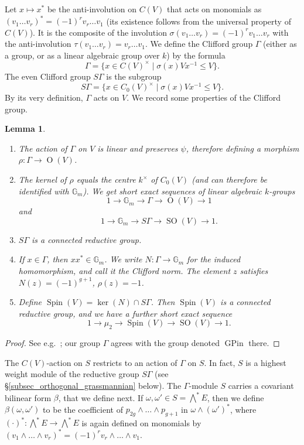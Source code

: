 \documentclass{article} %
\newtheorem{lemma}[proposition]{Lemma}
\numberwithin{equation}{section}
\newcommand{\G}{\mathbb{G}}
\DeclareMathOperator{\SO}{SO}
\DeclareMathOperator{\OO}{O}
\DeclareMathOperator{\Spin}{Spin}
\begin{document}
Let $x \mapsto x^\ast$ be the anti-involution on $C(V)$ that acts on monomials  as $(v_1 \dots v_r)^\ast = (-1)^r v_r \dots v_1$ (its existence follows from the universal property of $C(V)$). It is the composite of the involution $\sigma(v_1 \dots v_r) = (-1)^r v_1 \dots v_r$ with the anti-involution $\tau(v_1 \dots v_r) = v_r \dots v_1$. We define the Clifford group $\Gamma$ (either as a group, or as a linear algebraic group over $k$) by the formula
\[ \Gamma = \{ x \in C(V)^\times \mid \sigma(x) V x^{-1}\leq V \}. \]
The even Clifford group $S \Gamma$ is the subgroup
\[ S \Gamma = \{ x \in C_0(V)^\times \mid \sigma(x) V x^{-1} \leq V \}.\]
By its very definition, $\Gamma$ acts on $V$. We record some properties of the Clifford group.
\begin{lemma}
    \begin{enumerate}
        \item The action of $\Gamma$ on $V$ is linear and preserves $\psi$, therefore defining a morphism $\rho : \Gamma \to \OO(V)$.
        \item The kernel of $\rho$ equals the centre $k^\times$ of $C_0(V)$ (and can therefore be identified with $\G_m$). We get short exact sequences of linear algebraic $k$-groups
        \[ 1 \to \G_m \to \Gamma \to \OO(V) \to 1 \]
        and
        \[ 1 \to \G_m \to S \Gamma \to \SO(V) \to 1. \]
        \item $S \Gamma$ is a connected reductive group.
        \item If $x \in \Gamma$, then $x x^\ast \in \G_m$. We write $N : \Gamma \to \G_m$ for the induced homomorphism, and call it the Clifford norm. The element $z$ satisfies $N(z) = (-1)^{g+1}$, $\rho(z) = -1$.
        \item Define $\Spin(V) = \ker(N) \cap S \Gamma$. Then $\Spin(V)$ is a connected reductive group, and we have a further short exact sequence
        \[ 1 \to \mu_2 \to \Spin(V) \to \SO(V) \to 1. \]
    \end{enumerate}
\end{lemma}
\begin{proof}
    See e.g.\ \cite[Appendix C]{Con14}; our group $\Gamma$ agrees with the group denoted $\operatorname{GPin}$ there. 
\end{proof}
The $C(V)$-action on $S$ restricts to an action of $\Gamma$ on $S$. In fact, $S$ is a highest weight module of the reductive group $S \Gamma$ (see \S \ref{subsec_orthogonal_grassmannian} below). The $\Gamma$-module $S$ carries a covariant bilinear form $\beta$, that we define next. If $\omega, \omega' 
\in S = \bigwedge^\ast E$, then we define $\beta(\omega, \omega')$ to be the coefficient of $p_{2g} \wedge \dots \wedge p_{g+1}$ in $\omega \wedge (\omega')^\ast$, where $(\cdot)^\ast : \bigwedge^\ast E \to \bigwedge^\ast E$ is again defined on monomials by $(v_1 \wedge \dots \wedge v_r)^\ast = (-1)^r v_r \wedge \dots \wedge v_1$.
\end{document}
